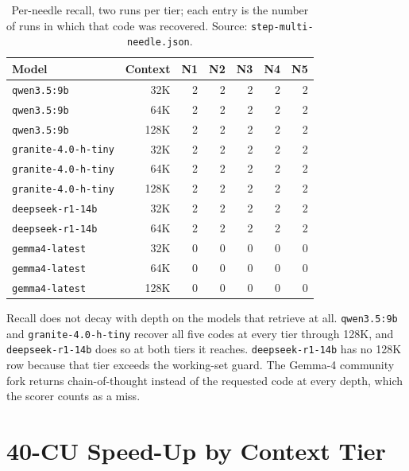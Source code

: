 \documentclass[11pt,a4paper]{article}
\begin{document}
\begin{table}[h]
\centering\small
\caption{Per-needle recall, two runs per tier; each entry is the number
of runs in which that code was recovered.  Source:
\texttt{step-multi-needle.json}.}
\label{tab:s-needle}
\begin{tabular}{@{}lrrrrrr@{}}
\toprule
\textbf{Model} & \textbf{Context} & \textbf{N1} & \textbf{N2} & \textbf{N3} & \textbf{N4} & \textbf{N5} \\
\midrule
\texttt{qwen3.5:9b}        &  32K & 2 & 2 & 2 & 2 & 2 \\
\texttt{qwen3.5:9b}        &  64K & 2 & 2 & 2 & 2 & 2 \\
\texttt{qwen3.5:9b}        & 128K & 2 & 2 & 2 & 2 & 2 \\
\texttt{granite-4.0-h-tiny} &  32K & 2 & 2 & 2 & 2 & 2 \\
\texttt{granite-4.0-h-tiny} &  64K & 2 & 2 & 2 & 2 & 2 \\
\texttt{granite-4.0-h-tiny} & 128K & 2 & 2 & 2 & 2 & 2 \\
\texttt{deepseek-r1-14b}   &  32K & 2 & 2 & 2 & 2 & 2 \\
\texttt{deepseek-r1-14b}   &  64K & 2 & 2 & 2 & 2 & 2 \\
\texttt{gemma4-latest}     &  32K & 0 & 0 & 0 & 0 & 0 \\
\texttt{gemma4-latest}     &  64K & 0 & 0 & 0 & 0 & 0 \\
\texttt{gemma4-latest}     & 128K & 0 & 0 & 0 & 0 & 0 \\
\bottomrule
\end{tabular}
\end{table}

Recall does not decay with depth on the models that retrieve at all.
\texttt{qwen3.5:9b} and \texttt{granite-4.0-h-tiny} recover all five
codes at every tier through 128K, and \texttt{deepseek-r1-14b} does so
at both tiers it reaches.  \texttt{deepseek-r1-14b}
has no 128K row because that tier exceeds the working-set guard.  The
Gemma-4 community fork returns chain-of-thought instead of the requested
code at every depth, which the scorer counts as a miss.

\section{40-CU Speed-Up by Context Tier}
\end{document}
